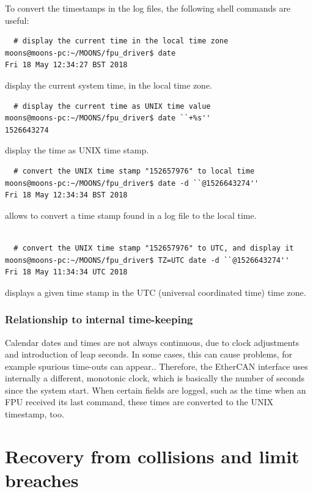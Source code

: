 \documentclass[11pt,a4paper]{report}
\begin{document}
To convert the timestamps in the log files, the following
shell commands are useful:

\begin{verbatim}
  # display the current time in the local time zone
moons@moons-pc:~/MOONS/fpu_driver$ date
Fri 18 May 12:34:27 BST 2018
\end{verbatim}
display the current system time, in the local time zone.

\begin{verbatim}
  # display the current time as UNIX time value
moons@moons-pc:~/MOONS/fpu_driver$ date ``+%s''
1526643274
\end{verbatim}
display the time as UNIX time stamp.

\begin{verbatim}
  # convert the UNIX time stamp "152657976" to local time
moons@moons-pc:~/MOONS/fpu_driver$ date -d ``@1526643274''
Fri 18 May 12:34:34 BST 2018
\end{verbatim}
allows to convert a time stamp found in a log file to
the local time.

\begin{verbatim}
  
  # convert the UNIX time stamp "152657976" to UTC, and display it
moons@moons-pc:~/MOONS/fpu_driver$ TZ=UTC date -d ``@1526643274''
Fri 18 May 11:34:34 UTC 2018
\end{verbatim}
displays a given time stamp in the UTC (universal coordinated time)
time zone.

\subsubsection{Relationship to internal time-keeping}
Calendar dates and times are not always continuous, due to clock
adjustments and introduction of leap seconds. In some cases, this can
cause problems, for example spurious time-outs can appear.. Therefore,
the EtherCAN interface uses internally a different, monotonic clock, which is
basically the number of seconds since the system start. When certain
fields are logged, such as the time when an FPU received its last
command, these times are converted to the UNIX timestamp, too.


\section{Recovery from collisions and limit breaches}
\label{sec:recovery}
\end{document}
